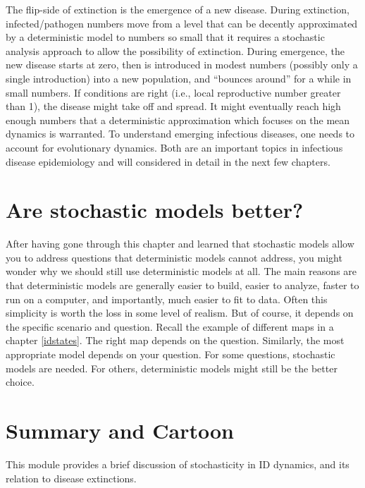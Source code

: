 \documentclass[]{book}
\theoremstyle{definition}
\theoremstyle{definition}
\theoremstyle{definition}
\theoremstyle{remark}
\begin{document}
The flip-side of extinction is the emergence of a new disease. During
extinction, infected/pathogen numbers move from a level that can be
decently approximated by a deterministic model to numbers so small that
it requires a stochastic analysis approach to allow the possibility of
extinction. During emergence, the new disease starts at zero, then is
introduced in modest numbers (possibly only a single introduction) into
a new population, and ``bounces around'' for a while in small numbers.
If conditions are right (i.e., local reproductive number greater than
1), the disease might take off and spread. It might eventually reach
high enough numbers that a deterministic approximation which focuses on
the mean dynamics is warranted. To understand emerging infectious
diseases, one needs to account for evolutionary dynamics. Both are an
important topics in infectious disease epidemiology and will considered
in detail in the next few chapters.

\hypertarget{are-stochastic-models-better}{%
\section{Are stochastic models
better?}\label{are-stochastic-models-better}}

After having gone through this chapter and learned that stochastic
models allow you to address questions that deterministic models cannot
address, you might wonder why we should still use deterministic models
at all. The main reasons are that deterministic models are generally
easier to build, easier to analyze, faster to run on a computer, and
importantly, much easier to fit to data. Often this simplicity is worth
the loss in some level of realism. But of course, it depends on the
specific scenario and question. Recall the example of different maps in
a chapter \ref{idstates}. The right map depends on the question.
Similarly, the most appropriate model depends on your question. For some
questions, stochastic models are needed. For others, deterministic
models might still be the better choice.

\hypertarget{summary-and-cartoon-3}{%
\section{Summary and Cartoon}\label{summary-and-cartoon-3}}

This module provides a brief discussion of stochasticity in ID dynamics,
and its relation to disease extinctions.
\end{document}
